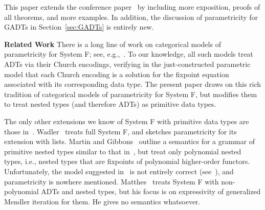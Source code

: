 \documentclass{lmcs}
\theoremstyle{plain}\newtheorem{satz}[thm]{Satz}
\begin{document}
This paper extends the conference paper~\cite{jgj21} by including more
exposition, proofs of all theorems, and more examples. In addition,
the discussion of parametricity for GADTs in Section~\ref{sec:GADTs}
is entirely new.

\vspace*{0.05in}

\noindent
{\bf Related Work}\/ There is a long line of work on categorical
models of parametricity for System F; see,
e.g.,~\cite{bfss90,bm05,dr04,gjfor15,has94,jac99,mr92,rr94}.  To our
knowledge, all such models treat ADTs via their Church encodings,
verifying in the just-constructed parametric model that each Church
encoding is a solution for the fixpoint equation associated with its
corresponding data type. The present paper draws on this rich
tradition of categorical models of parametricity for System F, but
modifies them to treat nested types (and therefore ADTs) as primitive
data types.

The only other extensions we know of System F with primitive data
types are those in~\cite{mat11,mg01,pit98,pit00,wad89}.
Wadler~\cite{wad89} treats full System F, and sketches parametricity
for its extension with lists. Martin and Gibbons~\cite{mg01} outline a
semantics for a grammar of primitive nested types similar to that
in~\cite{jp19}, but treat only polynomial nested types, i.e., nested
types that are fixpoints of polynomial higher-order
functors. Unfortunately, the model suggested in~\cite{mg01} is not
entirely correct (see~\cite{jp19}), and parametricity is nowhere
mentioned.  Matthes~\cite{mat11} treats System F with non-polynomial
ADTs and nested types, but his focus is on expressivity of generalized
Mendler iteration for them. He gives no semantics whatsoever.
\end{document}
